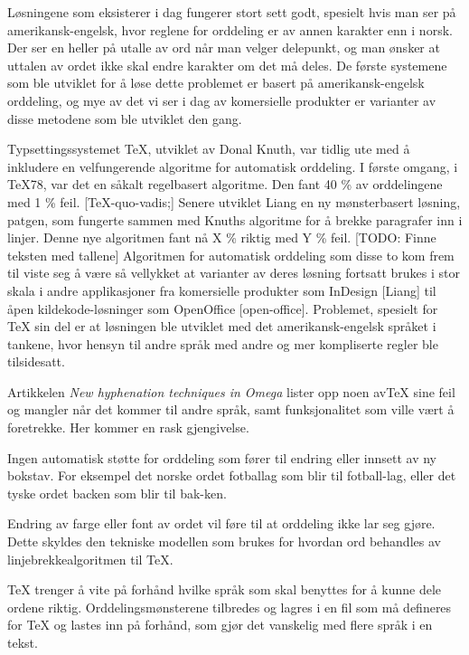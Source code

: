 Løsningene som eksisterer i dag fungerer stort sett godt, spesielt hvis man ser på amerikansk-engelsk, hvor reglene for orddeling er av annen karakter enn i norsk. Der ser en heller på utalle av ord når man velger delepunkt, og man ønsker at uttalen av ordet ikke skal endre karakter om det må deles. De første systemene som ble utviklet for å løse dette problemet er basert på amerikansk-engelsk orddeling, og mye av det vi ser i dag av komersielle produkter er varianter av disse metodene som ble utviklet den gang.

Typsettingssystemet \TeX{}, utviklet av Donal Knuth, var tidlig ute med å inkludere en velfungerende algoritme for automatisk orddeling. I første omgang, i TeX78, var det en såkalt regelbasert algoritme. Den fant 40 \% av orddelingene med 1 \% feil. [TeX-quo-vadis;] Senere utviklet Liang en ny mønsterbasert løsning, patgen, som fungerte sammen med Knuths algoritme for å brekke paragrafer inn i linjer. Denne nye algoritmen fant nå X \% riktig med Y \% feil. [TODO: Finne teksten med tallene] Algoritmen for automatisk orddeling som disse to kom frem til viste seg å være så vellykket at varianter av deres løsning fortsatt brukes i stor skala i andre applikasjoner fra komersielle produkter som InDesign [Liang] til åpen kildekode-løsninger som OpenOffice [open-office]. Problemet, spesielt for TeX sin del er at løsningen ble utviklet med det amerikansk-engelsk språket i tankene, hvor hensyn til andre språk med andre og mer kompliserte regler ble tilsidesatt.

Artikkelen \textit{New hyphenation techniques in Omega} \cite{omega} lister opp noen av\TeX{} sine feil og mangler når det kommer til andre språk, samt funksjonalitet som ville vært å foretrekke. Her kommer en rask gjengivelse.

\begin{items}
\item Ingen automatisk støtte for orddeling som fører til endring eller innsett av ny bokstav. For eksempel det norske ordet fotballag som blir til fotball-lag, eller det tyske ordet backen som blir til bak-ken.
\item Endring av farge eller font av ordet vil føre til at orddeling ikke lar seg gjøre. Dette skyldes den tekniske modellen som brukes for hvordan ord behandles av linjebrekkealgoritmen til TeX.
\item TeX trenger å vite på forhånd hvilke språk som skal benyttes for å kunne dele ordene riktig. Orddelingsmønsterene tilbredes og lagres i en fil som må defineres for TeX og lastes inn på forhånd, som gjør det vanskelig med flere språk i en tekst.
\end{items}

